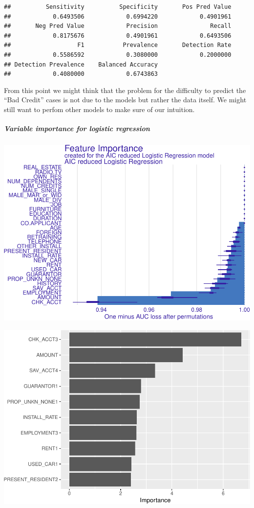 \documentclass[
]{article}
\begin{document}
\begin{verbatim}
##          Sensitivity          Specificity       Pos Pred Value 
##            0.6493506            0.6994220            0.4901961 
##       Neg Pred Value            Precision               Recall 
##            0.8175676            0.4901961            0.6493506 
##                   F1           Prevalence       Detection Rate 
##            0.5586592            0.3080000            0.2000000 
## Detection Prevalence    Balanced Accuracy 
##            0.4080000            0.6743863
\end{verbatim}

From this point we might think that the problem for the difficulty to
predict the ``Bad Credit'' cases is not due to the models but rather the
data itself. We might still want to perfom other models to make sure of
our intuition.

\hypertarget{variable-importance-for-logistic-regression}{%
\subparagraph{Variable importance for logistic
regression}\label{variable-importance-for-logistic-regression}}

\includegraphics{report_files/figure-latex/unnamed-chunk-43-1.pdf}

\includegraphics{report_files/figure-latex/unnamed-chunk-44-1.pdf}
\end{document}
